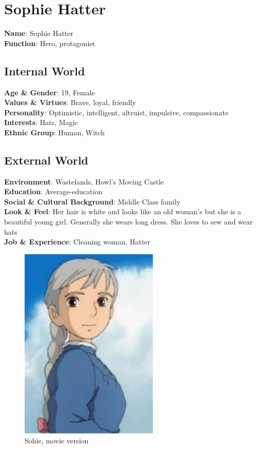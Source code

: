 \section{Sophie Hatter}

\begin{minipage}{0.5\textwidth}
\textbf{Name}: Sophie Hatter \\
\textbf{Function}: Hero, protagonist

\subsection{Internal World}

\textbf{Age \& Gender}: 19, Female \\
\textbf{Values \& Virtues}: Brave, loyal, friendly \\
\textbf{Personality}: Optimistic, intelligent, altruist, impulsive, compassionate \\
\textbf{Interests}: Hats, Magic \\
\textbf{Ethnic Group}: Human, Witch

\subsection{External World}
\textbf{Environment}: Wastelands, Howl’s Moving Castle \\
\textbf{Education}: Average-education \\
\textbf{Social \& Cultural Background}: Middle Class family \\
\textbf{Look \& Feel}: Her hair is white and looks like an old woman’s but she is a beautiful young girl. Generally she wears long dress. She loves to sew and wear hats \\
\textbf{Job \& Experience}: Cleaning woman, Hatter \\

\end{minipage}%
%
\hfill\begin{minipage}{0.4\textwidth}
\begin{figure}[H]
  \includegraphics{Images/Characters/sophie}
  \caption{Sohie, movie version}
  \end{figure}
\end{minipage}

